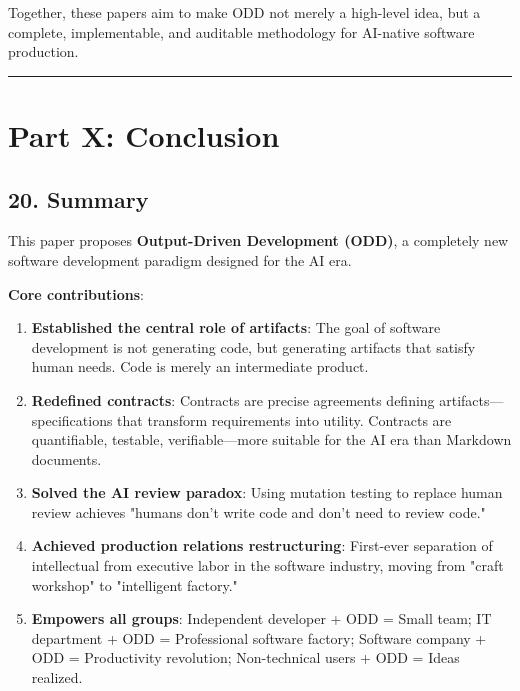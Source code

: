 \documentclass[
]{article}
\begin{document}
Together, these papers aim to make ODD not merely a high-level idea, but
a complete, implementable, and auditable methodology for AI-native
software production.

\begin{center}\rule{0.5\linewidth}{0.5pt}\end{center}

\hypertarget{part-x-conclusion}{%
\section{Part X: Conclusion}\label{part-x-conclusion}}

\hypertarget{20-summary}{%
\subsection{20. Summary}\label{20-summary}}

This paper proposes \textbf{Output-Driven Development (ODD)}, a
completely new software development paradigm designed for the AI era.

\textbf{Core contributions}:

\begin{enumerate}
\def\labelenumi{\arabic{enumi}.}
\item
  \textbf{Established the central role of artifacts}: The goal of
  software development is not generating code, but generating artifacts
  that satisfy human needs. Code is merely an intermediate product.
\item
  \textbf{Redefined contracts}: Contracts are precise agreements
  defining artifacts---specifications that transform requirements into
  utility. Contracts are quantifiable, testable, verifiable---more
  suitable for the AI era than Markdown documents.
\item
  \textbf{Solved the AI review paradox}: Using mutation testing to
  replace human review achieves "humans don't write code and don't need
  to review code."
\item
  \textbf{Achieved production relations restructuring}: First-ever
  separation of intellectual from executive labor in the software
  industry, moving from "craft workshop" to "intelligent factory."
\item
  \textbf{Empowers all groups}: Independent developer + ODD = Small
  team; IT department + ODD = Professional software factory; Software
  company + ODD = Productivity revolution; Non-technical users + ODD =
  Ideas realized.
\end{enumerate}
\end{document}
